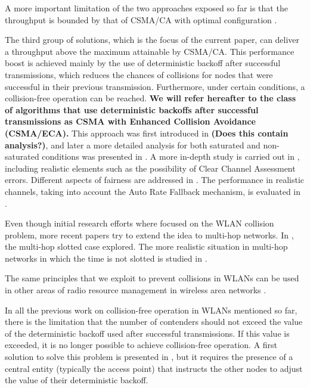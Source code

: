 \documentclass[conference]{IEEEtran}
\newcommand{\Az}[1]{{\bf{#1}}}
\begin{document}
A more important limitation of the two approaches exposed so far is that the throughput is bounded by that of CSMA/CA with optimal configuration \cite{cali2000dti,bianchi2000pai}.

The third group of solutions, which is the focus of the current paper, can deliver a throughput above the maximum attainable by CSMA/CA. This performance boost is achieved mainly by the use of deterministic backoff after successful transmissions, which reduces the chances of collisions for nodes that were successful in their previous transmission. Furthermore, under certain conditions, a collision-free operation can be reached. \Az{We will refer hereafter to the class of algorithms that use deterministic backoffs after successful transmissions as CSMA with Enhanced Collision Avoidance (CSMA/ECA).} This approach was first introduced in \cite{barcelo2008lba} \Az{(Does this contain analysis?)}, and later a more detailed analysis for both saturated and non-saturated conditions was presented in \cite{bellalta2009vtc}.
A more in-depth study is carried out in \cite{he2009srb}, including realistic elements such as the possibility of Clear Channel Assessment errors.
Different aspects of fairness are addressed in \cite{he2009srb,barcelo2010fcc,fang2011dlm}.
The performance in realistic channels, taking into account the Auto Rate Fallback mechanism, is evaluated in \cite{martorell2012pec,martorell2012tfl}.

Even though initial research efforts where focused on the WLAN collision problem, more recent papers try to extend the idea to multi-hop networks.
In \cite{hui2011epp}, the multi-hop slotted case explored.
The more realistic situation in multi-hop networks in which the time is not slotted is studied in \cite{barcelo2013dcc}.

The same principles that we exploit to prevent collisions in WLANs can be used in other areas of radio resource management in wireless area networks \cite{duffy2011dcs,checco2012scs,checco2012lbc,khan2013aso}.

In all the previous work on collision-free operation in WLANs mentioned so far, there is the limitation that the number of contenders should not exceed the value of the deterministic backoff used after successful transmissions.
If this value is exceeded, it is no longer possible to achieve collision-free operation.
A first solution to solve this problem is presented in \cite{barcelo2011tcf}, but it requires the presence of a central entity (typically the access point) that instructs the other nodes to adjust the value of their deterministic backoff.
\end{document}
